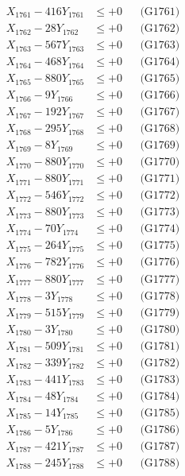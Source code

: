 \documentclass[a4paper,10pt]{article}
\begin{document}
{\begin{align}
\allowbreak
X_{1761} - 416Y_{1761} &\leq +0 && \text{(G1761)} \\
X_{1762} - 28Y_{1762} &\leq +0 && \text{(G1762)} \\
X_{1763} - 567Y_{1763} &\leq +0 && \text{(G1763)} \\
X_{1764} - 468Y_{1764} &\leq +0 && \text{(G1764)} \\
X_{1765} - 880Y_{1765} &\leq +0 && \text{(G1765)} \\
X_{1766} - 9Y_{1766} &\leq +0 && \text{(G1766)} \\
X_{1767} - 192Y_{1767} &\leq +0 && \text{(G1767)} \\
X_{1768} - 295Y_{1768} &\leq +0 && \text{(G1768)} \\
X_{1769} - 8Y_{1769} &\leq +0 && \text{(G1769)} \\
X_{1770} - 880Y_{1770} &\leq +0 && \text{(G1770)} \\
\allowbreak
X_{1771} - 880Y_{1771} &\leq +0 && \text{(G1771)} \\
X_{1772} - 546Y_{1772} &\leq +0 && \text{(G1772)} \\
X_{1773} - 880Y_{1773} &\leq +0 && \text{(G1773)} \\
X_{1774} - 70Y_{1774} &\leq +0 && \text{(G1774)} \\
X_{1775} - 264Y_{1775} &\leq +0 && \text{(G1775)} \\
X_{1776} - 782Y_{1776} &\leq +0 && \text{(G1776)} \\
X_{1777} - 880Y_{1777} &\leq +0 && \text{(G1777)} \\
X_{1778} - 3Y_{1778} &\leq +0 && \text{(G1778)} \\
X_{1779} - 515Y_{1779} &\leq +0 && \text{(G1779)} \\
X_{1780} - 3Y_{1780} &\leq +0 && \text{(G1780)} \\
\allowbreak
X_{1781} - 509Y_{1781} &\leq +0 && \text{(G1781)} \\
X_{1782} - 339Y_{1782} &\leq +0 && \text{(G1782)} \\
X_{1783} - 441Y_{1783} &\leq +0 && \text{(G1783)} \\
X_{1784} - 48Y_{1784} &\leq +0 && \text{(G1784)} \\
X_{1785} - 14Y_{1785} &\leq +0 && \text{(G1785)} \\
X_{1786} - 5Y_{1786} &\leq +0 && \text{(G1786)} \\
X_{1787} - 421Y_{1787} &\leq +0 && \text{(G1787)} \\
X_{1788} - 245Y_{1788} &\leq +0 && \text{(G1788)} \\

\end{align}}
\end{document}
